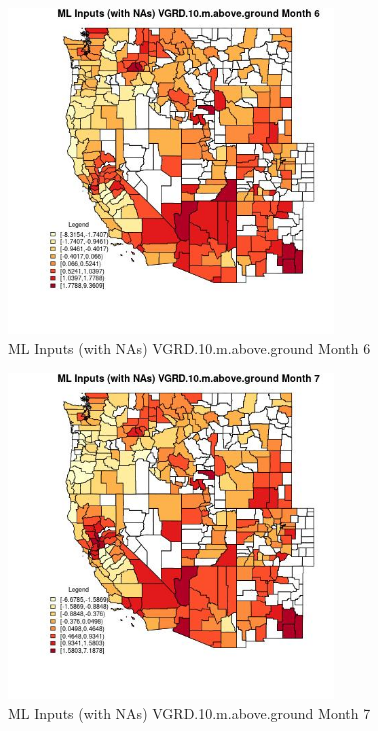 \begin{figure} 
\centering  
\includegraphics[width=0.77\textwidth]{Code_Outputs/Report_ML_input_PM25_Step4_part_f_de_duplicated_aveswNAs_CountyVGRD10mabovegroundmedianMonth6.jpg} 
\caption{\label{fig:Report_ML_input_PM25_Step4_part_f_de_duplicated_aveswNAsCountyVGRD10mabovegroundmedianMonth6}ML Inputs (with NAs) VGRD.10.m.above.ground Month 6} 
\end{figure} 
 

\begin{figure} 
\centering  
\includegraphics[width=0.77\textwidth]{Code_Outputs/Report_ML_input_PM25_Step4_part_f_de_duplicated_aveswNAs_CountyVGRD10mabovegroundmedianMonth7.jpg} 
\caption{\label{fig:Report_ML_input_PM25_Step4_part_f_de_duplicated_aveswNAsCountyVGRD10mabovegroundmedianMonth7}ML Inputs (with NAs) VGRD.10.m.above.ground Month 7} 
\end{figure} 
 

